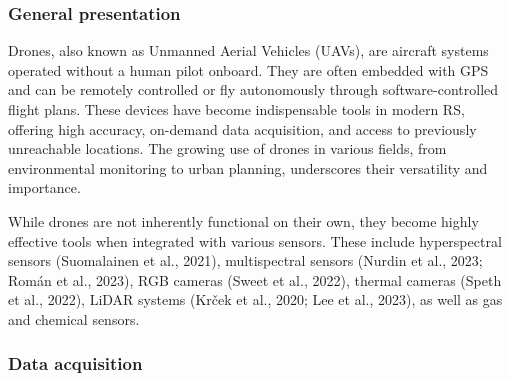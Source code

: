 \documentclass[
  letterpaper,
  11pt,
  english,
  singlespacing,
  headsepline]{MastersDoctoralThesis}
\begin{document}
\begin{spacing}{1.5}
\subsubsection{General presentation}\label{sec-Drones}

Drones, also known as Unmanned Aerial Vehicles (UAVs), are aircraft
systems operated without a human pilot onboard. They are often embedded
with GPS and can be remotely controlled or fly autonomously through
software-controlled flight plans. These devices have become
indispensable tools in modern RS, offering high accuracy, on-demand data
acquisition, and access to previously unreachable locations. The growing
use of drones in various fields, from environmental monitoring to urban
planning, underscores their versatility and importance.

While drones are not inherently functional on their own, they become
highly effective tools when integrated with various sensors. These
include hyperspectral sensors (Suomalainen et al., 2021), multispectral
sensors (Nurdin et al., 2023; Román et al., 2023), RGB cameras (Sweet et
al., 2022), thermal cameras (Speth et al., 2022), LiDAR systems (Krček
et al., 2020; Lee et al., 2023), as well as gas and chemical sensors.

\subsubsection{Data acquisition}\label{data-acquisition}

\begin{figure}

\end{figure}
\end{spacing}
\end{document}
